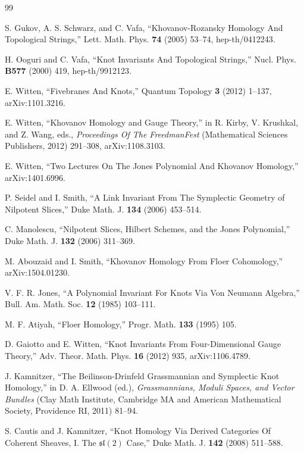 \newpage
\begin{thebibliography}{99}
\small

 S. Gukov, A. S. Schwarz, and C. Vafa,
  ``Khovanov-Rozansky Homology And Topological Strings,''
  Lett. Math. Phys. \textbf{74} (2005) 53--74, hep-th/0412243.

 H. Ooguri and C. Vafa, ``Knot Invariants And Topological Strings,''
  Nucl. Phys. \textbf{B577} (2000) 419, hep-th/9912123.

 E. Witten, ``Fivebranes And Knots,''
  Quantum Topology \textbf{3} (2012) 1--137, arXiv:1101.3216.

 E. Witten, ``Khovanov Homology and Gauge Theory,''
  in R. Kirby, V. Krushkal, and Z. Wang, eds.,
  \emph{Proceedings Of The FreedmanFest} (Mathematical Sciences Publishers, 2012) 291--308,
  arXiv:1108.3103.

 E. Witten, ``Two Lectures On The Jones Polynomial And Khovanov Homology,''
  arXiv:1401.6996.

 P. Seidel and I. Smith, ``A Link Invariant From The Symplectic Geometry
  of Nilpotent Slices,'' Duke Math. J. \textbf{134} (2006) 453--514.

 C. Manolescu, ``Nilpotent Slices, Hilbert Schemes, and the Jones Polynomial,''
  Duke Math. J. \textbf{132} (2006) 311--369.

 M. Abouzaid and I. Smith, ``Khovanov Homology From Floer Cohomology,''
  arXiv:1504.01230.

 V. F. R. Jones, ``A Polynomial Invariant For Knots Via Von Neumann Algebra,''
  Bull. Am. Math. Soc. \textbf{12} (1985) 103--111.

 M. F. Atiyah, ``Floer Homology,'' Progr. Math. \textbf{133} (1995) 105.

 D. Gaiotto and E. Witten, ``Knot Invariants From Four-Dimensional Gauge Theory,''
  Adv. Theor. Math. Phys. \textbf{16} (2012) 935, arXiv:1106.4789.

 J. Kamnitzer, ``The Beilinson-Drinfeld Grassmannian and Symplectic Knot Homology,''
  in D. A. Ellwood (ed.), \emph{Grassmannians, Moduli Spaces, and Vector Bundles}
  (Clay Math Institute, Cambridge MA and American Mathematical Society, Providence RI, 2011) 81--94.

 S. Cautis and J. Kamnitzer, ``Knot Homology Via Derived Categories Of Coherent Sheaves,
  I. The $\mathfrak{sl}(2)$ Case,'' Duke Math. J. \textbf{142} (2008) 511--588.


\end{thebibliography}

